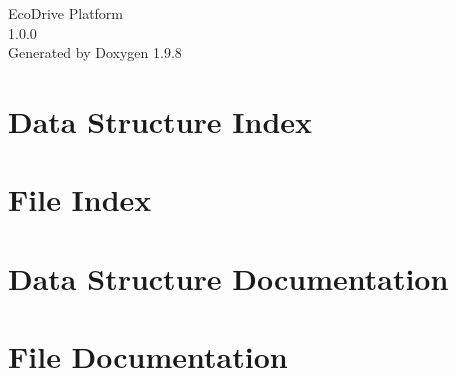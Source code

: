 \documentclass[twoside]{book}
\newcommand{\+}{\discretionary{\mbox{\scriptsize$\hookleftarrow$}}{}{}}
\newcommand{\clearemptydoublepage}{%
    \newpage{\pagestyle{empty}\cleardoublepage}%
  }
\begin{document}
  \raggedbottom
    \hypersetup{pageanchor=false,
                bookmarksnumbered=true,
                pdfencoding=unicode
               }
  \begin{titlepage}
  \vspace*{7cm}
  \begin{center}%
  {\Large Eco\+Drive Platform}\\
  [1ex]\large 1.\+0.\+0 \\
  \vspace*{1cm}
  {\large Generated by Doxygen 1.9.8}\\
  \end{center}
  \end{titlepage}
  \clearemptydoublepage
  \tableofcontents
  \clearemptydoublepage
  \hypersetup{pageanchor=true}


\chapter{Data Structure Index}

\chapter{File Index}

\chapter{Data Structure Documentation}










\chapter{File Documentation}




















  \backmatter
  \newpage
  \clearemptydoublepage
  \printindex
\end{document}
